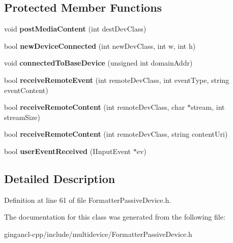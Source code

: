 \subsection*{Protected Member Functions}
\begin{CompactItemize}
\item 
void {\bf postMediaContent} (int destDevClass)\label{classbr_1_1pucrio_1_1telemidia_1_1ginga_1_1ncl_1_1multidevice_1_1FormatterPassiveDevice_3424c5b8f11c72ffff3d50f9fc055d2c}

\item 
bool {\bf newDeviceConnected} (int newDevClass, int w, int h)\label{classbr_1_1pucrio_1_1telemidia_1_1ginga_1_1ncl_1_1multidevice_1_1FormatterPassiveDevice_4820c061de3b177c376e96dd45c4fca0}

\item 
void \textbf{connectedToBaseDevice} (unsigned int domainAddr)\label{classbr_1_1pucrio_1_1telemidia_1_1ginga_1_1ncl_1_1multidevice_1_1FormatterPassiveDevice_f7e3b3635d3e38bed8ead0321733791b}

\item 
bool {\bf receiveRemoteEvent} (int remoteDevClass, int eventType, string eventContent)\label{classbr_1_1pucrio_1_1telemidia_1_1ginga_1_1ncl_1_1multidevice_1_1FormatterPassiveDevice_d0ee06b25589fbeea9b03c945ff41b29}

\item 
bool {\bf receiveRemoteContent} (int remoteDevClass, char $\ast$stream, int streamSize)\label{classbr_1_1pucrio_1_1telemidia_1_1ginga_1_1ncl_1_1multidevice_1_1FormatterPassiveDevice_f4051428a3f94469cac462ee8e875bd5}

\item 
bool \textbf{receiveRemoteContent} (int remoteDevClass, string contentUri)\label{classbr_1_1pucrio_1_1telemidia_1_1ginga_1_1ncl_1_1multidevice_1_1FormatterPassiveDevice_a70ef1a18d742b5c8d124330f1c37871}

\item 
bool \textbf{userEventReceived} (IInputEvent $\ast$ev)\label{classbr_1_1pucrio_1_1telemidia_1_1ginga_1_1ncl_1_1multidevice_1_1FormatterPassiveDevice_1520ea57105d2db3e7f818b4d60667af}

\end{CompactItemize}


\subsection{Detailed Description}




Definition at line 61 of file FormatterPassiveDevice.h.

The documentation for this class was generated from the following file:\begin{CompactItemize}
\item 
gingancl-cpp/include/multidevice/FormatterPassiveDevice.h\end{CompactItemize}
